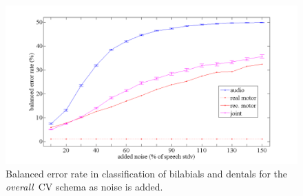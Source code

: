 \documentclass{pnastwo}
\newcommand{\overall}{\emph{overall}}
\begin{document}
\begin{figure}[t]
  \centerline{\includegraphics[width=\textwidth]{figs/exp3}}
  \caption{Balanced error rate in classification of bilabials and dentals for the
    \overall\ CV schema as noise is added.}
  \label{fig:class3_perf}
\end{figure}
\end{document}
